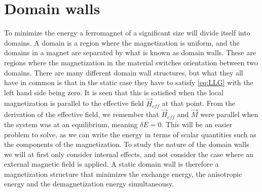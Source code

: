 \documentclass[12pt, a4paper, twoside, openright]{article}		%
\let\oldsection\section
\def\section{\cleardoublepage\oldsection}
\numberwithin{equation}{section}
\begin{document}
\section{Domain walls} \label{sec:DW}
To minimize the energy a ferromagnet of a significant size will divide itself into domains. A domain is a region where the magnetization is uniform, and the domains in a magnet are separated by what is known as domain walls. These are regions where the magnetization in the material switches orientation between two domains. There are many different domain wall structures, but what they all have in common is that in the static case they have to satisfy \eqref{eq:LLG} with the left hand side being zero. It is seen that this is satisfied when the local magnetization is parallel to the effective field $\vec{H}_{eff}$ at that point. From the derivation of the effective field, we remember that $\vec{H}_{eff}$ and $\vec{M}$ were parallel when the system was at an equilibrium, meaning $\delta E = 0$. This will be an easier problem to solve, as we can write the energy in terms of scalar quantities such as the components of the magnetization. To study the nature of the domain walls we will at first only consider internal effects, and not consider the case where an external magnetic field is applied. A static domain wall is therefore a magnetization structure that minimizes the exchange energy, the anisotropic energy and the demagnetization energy simultaneousy.
\end{document}
